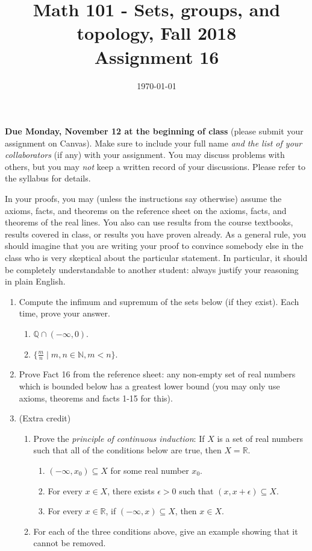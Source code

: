\documentclass{amsart}
\title[Math 101, Fall 2018: assignment 16]{Math 101 - Sets, groups, and topology, Fall 2018 \\ Assignment 16}
\date{\today}
\theoremstyle{definition}
\begin{document}

\maketitle

\textbf{Due Monday, November 12 at the beginning of class} (please submit your assignment on Canvas). Make sure to include your full name \emph{and the list of your collaborators} (if any) with your assignment. You may discuss problems with others, but you may \emph{not} keep a written record of your discussions. Please refer to the syllabus for details.

In your proofs, you may (unless the instructions say otherwise) assume the axioms, facts, and theorems on the reference sheet on the axioms, facts, and theorems of the real lines. You also can use results from the course textbooks, results covered in class, or results you have proven already. As a general rule, you should imagine that you are writing your proof to convince somebody else in the class who is very skeptical about the particular statement. In particular, it should be completely understandable to another student: always justify your reasoning in plain English. 

\begin{enumerate}
\item Compute the infimum and supremum of the sets below (if they exist). Each time, prove your answer.

  \begin{enumerate}
  \item $\mathbb{Q} \cap (-\infty, 0)$.
  \item $\{\frac{m}{n} \mid m, n \in \mathbb{N}, m < n\}$.
  \end{enumerate}
\item Prove Fact 16 from the reference sheet: any non-empty set of real numbers which is bounded below has a greatest lower bound (you may only use axioms, theorems and facts 1-15 for this).
\item (Extra credit)
  \begin{enumerate}
  \item Prove the \emph{principle of continuous induction}: If $X$ is a set of real numbers such that all of the conditions below are true, then $X = \mathbb{R}$.

  \begin{enumerate}
  \item $(-\infty, x_0) \subseteq X$ for some real number $x_0$.
  \item For every $x \in X$, there exists $\epsilon > 0$ such that $(x, x + \epsilon) \subseteq X$.
  \item For every $x \in \mathbb{R}$, if $(-\infty, x) \subseteq X$, then $x \in X$.
  \end{enumerate}

\item For each of the three conditions above, give an example showing that it cannot be removed.
  \end{enumerate}

\end{enumerate}



\end{document}
